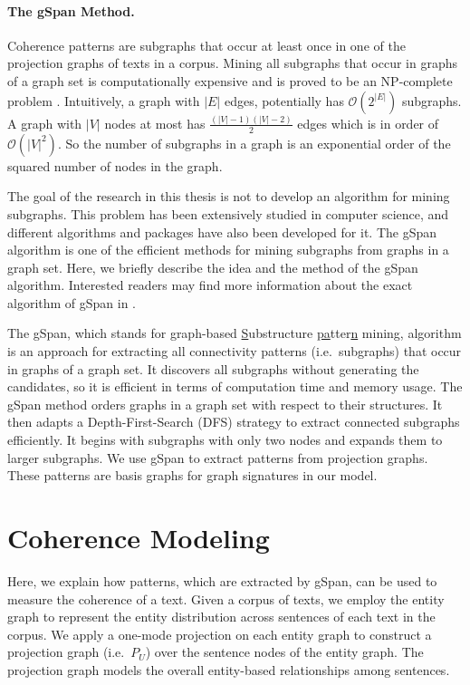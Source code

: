 \paragraph{The gSpan Method.}
%
Coherence patterns are subgraphs that occur at least once in one of the projection graphs of texts in a corpus. 
Mining all subgraphs that occur in graphs of a graph set is computationally expensive and is proved to be an NP-complete problem \cite{althaus04}. 
Intuitively, a graph with $|E|$ edges, potentially has $\mathcal{O} \left( 2^{| E |} \right)$ subgraphs.  
A graph with $| V |$ nodes at most has  $\frac{(| V |-1)(| V |-2)}{2}$ edges which is in order of $\mathcal{O} \left( | V | ^2 \right)$. 
So the number of subgraphs in a graph is an exponential order of the squared number of nodes in the graph. 

The goal of the research in this thesis is not to develop an algorithm for mining subgraphs.  
This problem has been extensively studied in computer science, and different algorithms and packages have also been developed for it. 
The gSpan algorithm \cite{yanxifeng02} is one of the efficient methods for mining subgraphs from graphs in a graph set. 
Here, we briefly describe the idea and the method of the gSpan algorithm.  
Interested readers may find more information about the exact algorithm of gSpan in . 

The gSpan, which stands for \underline{g}raph-based \underline{S}ubstructure \underline{pa}tter\underline{n} mining, algorithm is an approach for extracting all connectivity patterns (i.e.\ subgraphs) that occur in graphs of a graph set. 
It discovers all subgraphs without generating the candidates, so
it is efficient in terms of computation time and memory usage. 
The gSpan method orders graphs in a graph set with respect to their structures.
It then adapts a Depth-First-Search (DFS)  strategy to extract connected subgraphs efficiently. 
It begins with subgraphs with only two nodes and expands them to larger subgraphs. 
We use gSpan to extract patterns from projection graphs. 
These patterns are basis graphs for graph signatures in our model.  

\section{Coherence Modeling}
\label{sec:coh-modeling}

Here, we explain how patterns, which are extracted by gSpan, can be used to measure the coherence of a text. 
Given a corpus of texts, we employ the entity graph to represent the entity distribution across sentences of each text in the corpus. 
We apply a one-mode projection on each entity graph to construct a projection graph (i.e.\ $P_U$) over the sentence nodes of the entity graph. 
The projection graph models the overall entity-based relationships among sentences. 

